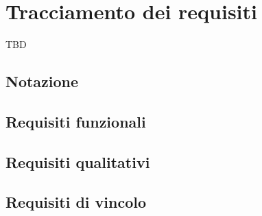 \setlength{\parindent}{12pt}

\section{Tracciamento dei requisiti}
TBD
\subsection{Notazione}
\subsection{Requisiti funzionali}
\subsection{Requisiti qualitativi}
\subsection{Requisiti di vincolo}